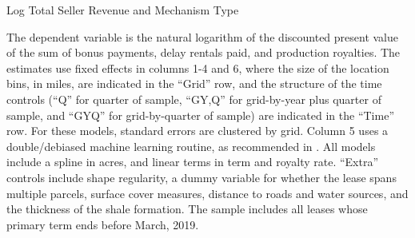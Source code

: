 \documentclass[12pt]{article}
\begin{document}
\begin{appendices}
\begin{table}[H]
	\begin{center}
	\begin{threeparttable}
		\caption{Log Total Seller Revenue and Mechanism Type}
		\label{tab:tableLogTotalRevenue}
		\small
		            
		\begin{tablenotes}
		\footnotesize
		\item The dependent variable is the natural logarithm of the discounted present value of the sum of bonus payments, delay rentals paid, and production royalties. The estimates use fixed effects in columns 1-4 and 6, where the size of the location bins, in miles, are indicated in the ``Grid'' row, and the structure of the time controls (``Q'' for quarter of sample, ``GY,Q'' for grid-by-year plus quarter of sample, and ``GYQ'' for grid-by-quarter of sample) are indicated in the ``Time'' row.  For these models, standard errors are clustered by grid.  Column 5 uses a double/debiased machine learning routine, as recommended in  \cite{chernozhukov2018double}.  All models include a spline in acres, and linear terms in term and royalty rate. ``Extra'' controls include shape regularity, a dummy variable for whether the lease spans multiple parcels, surface cover measures, distance to roads and water sources, and the thickness of the shale formation.  The sample includes all leases whose primary term ends before March, 2019.  		
		\end{tablenotes}
	\end{threeparttable}
	\end{center}
\end{table}


\end{appendices}
\end{document}
